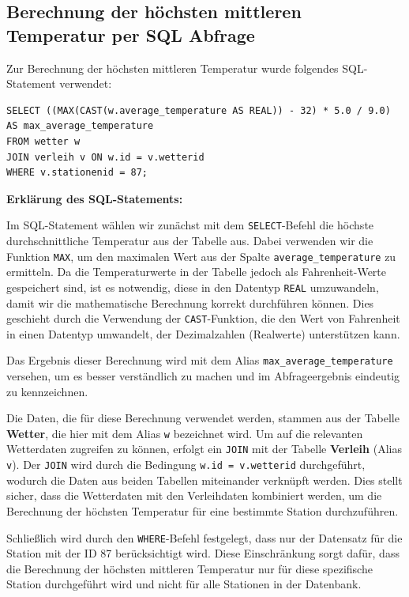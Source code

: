 \documentclass{article}
\begin{document}
\newpage
\subsection{Berechnung der höchsten mittleren Temperatur per SQL Abfrage}

Zur Berechnung der höchsten mittleren Temperatur wurde folgendes SQL-Statement verwendet:

\begin{verbatim}
SELECT ((MAX(CAST(w.average_temperature AS REAL)) - 32) * 5.0 / 9.0) 
AS max_average_temperature
FROM wetter w
JOIN verleih v ON w.id = v.wetterid
WHERE v.stationenid = 87;
\end{verbatim}

\textbf{Erklärung des SQL-Statements:}

Im SQL-Statement wählen wir zunächst mit dem \texttt{SELECT}-Befehl die höchste durchschnittliche Temperatur aus der Tabelle aus. Dabei verwenden wir die Funktion \texttt{MAX}, um den maximalen Wert aus der Spalte \texttt{average\_temperature} zu ermitteln. Da die Temperaturwerte in der Tabelle jedoch als Fahrenheit-Werte gespeichert sind, ist es notwendig, diese in den Datentyp \texttt{REAL} umzuwandeln, damit wir die mathematische Berechnung korrekt durchführen können. Dies geschieht durch die Verwendung der \texttt{CAST}-Funktion, die den Wert von Fahrenheit in einen Datentyp umwandelt, der Dezimalzahlen (Realwerte) unterstützen kann.

Das Ergebnis dieser Berechnung wird mit dem Alias \texttt{max\_average\_temperature} versehen, um es besser verständlich zu machen und im Abfrageergebnis eindeutig zu kennzeichnen.

Die Daten, die für diese Berechnung verwendet werden, stammen aus der Tabelle \textbf{Wetter}, die hier mit dem Alias \texttt{w} bezeichnet wird. Um auf die relevanten Wetterdaten zugreifen zu können, erfolgt ein \texttt{JOIN} mit der Tabelle \textbf{Verleih} (Alias \texttt{v}). Der \texttt{JOIN} wird durch die Bedingung \texttt{w.id = v.wetterid} durchgeführt, wodurch die Daten aus beiden Tabellen miteinander verknüpft werden. Dies stellt sicher, dass die Wetterdaten mit den Verleihdaten kombiniert werden, um die Berechnung der höchsten Temperatur für eine bestimmte Station durchzuführen.

Schließlich wird durch den \texttt{WHERE}-Befehl festgelegt, dass nur der Datensatz für die Station mit der ID 87 berücksichtigt wird. Diese Einschränkung sorgt dafür, dass die Berechnung der höchsten mittleren Temperatur nur für diese spezifische Station durchgeführt wird und nicht für alle Stationen in der Datenbank.
\end{document}
